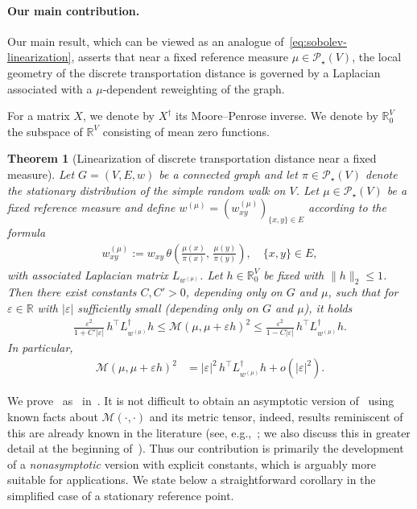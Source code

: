 \documentclass[11pt,a4paper]{article}
\newcommand{\Maas}{\mathcal{M}}
\newcommand{\Prob}{\mathscr{P}}
\newtheorem{theorem}{Theorem}[section]
\begin{document}
\paragraph{Our main contribution.}

Our main result, which can be viewed as an analogue of~\cref{eq:sobolev-linearization}, asserts that near a fixed reference measure $\mu\in\Prob_\star(V)$, the local geometry of the discrete transportation distance is governed by a Laplacian associated with a $\mu$-dependent reweighting of the graph.

For a matrix $X$, we denote by $X^\dagger$ its Moore--Penrose inverse. We denote by $\mathbb{R}^{V}_0$ the subspace of $\mathbb{R}^{V}$ consisting of mean zero functions.

\begin{theorem}[Linearization of discrete transportation distance near a fixed measure]\label{thm:linearization}
    Let $G=(V,E, w)$ be a connected graph and let $\pi\in\Prob_\star(V)$ denote the stationary distribution of the simple random walk on $V$. Let $\mu\in\Prob_\star(V)$ be a fixed reference measure and define $w^{(\mu)}=(w^{(\mu)}_{xy})_{\{x,y\}\in E}$ according to the formula
        \begin{align*}
            w^{(\mu)}_{xy} := w_{xy}\,\theta\left(\frac{\mu(x)}{\pi(x)},\,\frac{\mu(y)}{\pi(y)}\right),\quad \{x,y\}\in E,
        \end{align*}
    with associated Laplacian matrix $L_{w^{(\mu)}}$. Let $h\in\mathbb{R}^{V}_0$ be fixed with $\|h\|_2\le 1$. Then there exist constants $C,C' > 0$, depending only on $G$ and $\mu$, such that for $\varepsilon\in\mathbb{R}$ with $|\varepsilon|$ sufficiently small (depending only on $G$ and $\mu$), it holds
        \begin{align*}
            \frac{\varepsilon^2}{1 + C'|\varepsilon|}\, h^\top L_{w^{(\mu)}}^{\dagger} h
            \le \Maas(\mu,\mu+\varepsilon h)^2
            \le \frac{\varepsilon^2}{1 - C|\varepsilon|}\, h^\top L_{w^{(\mu)}}^{\dagger} h.
        \end{align*}
    In particular,
        \begin{align*}
            \Maas(\mu,\mu+\varepsilon h)^2 &= |\varepsilon|^2 \, h^\top L_{w^{(\mu)}}^{\dagger} h + o(|\varepsilon|^2).
        \end{align*}
\end{theorem}

We prove~ as~ in~. It is not difficult to obtain an asymptotic version of~ using known facts about $\Maas(\cdot,\cdot)$ and its metric tensor, indeed, results reminiscent of this are already known in the literature (see, e.g.,~\cite{li2022transport}; we also discuss this in greater detail at the beginning of~). Thus our contribution is primarily the development of a \emph{nonasymptotic} version with explicit constants, which is arguably more suitable for applications. We state below a straightforward corollary in the simplified case of a stationary reference point.
\end{document}
